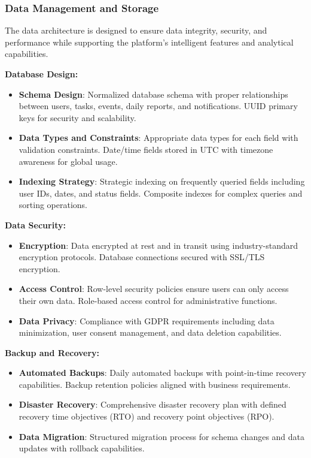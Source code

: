 \documentclass[12pt,a4paper]{article}
\begin{document}
\subsubsection{Data Management and Storage}

The data architecture is designed to ensure data integrity, security, and performance while supporting the platform's intelligent features and analytical capabilities.

\textbf{Database Design:}
\begin{itemize}
  \item \textbf{Schema Design}: Normalized database schema with proper relationships between users, tasks, events, daily reports, and notifications. UUID primary keys for security and scalability.
  \item \textbf{Data Types and Constraints}: Appropriate data types for each field with validation constraints. Date/time fields stored in UTC with timezone awareness for global usage.
  \item \textbf{Indexing Strategy}: Strategic indexing on frequently queried fields including user IDs, dates, and status fields. Composite indexes for complex queries and sorting operations.
\end{itemize}

\textbf{Data Security:}
\begin{itemize}
  \item \textbf{Encryption}: Data encrypted at rest and in transit using industry-standard encryption protocols. Database connections secured with SSL/TLS encryption.
  \item \textbf{Access Control}: Row-level security policies ensure users can only access their own data. Role-based access control for administrative functions.
  \item \textbf{Data Privacy}: Compliance with GDPR requirements including data minimization, user consent management, and data deletion capabilities.
\end{itemize}

\textbf{Backup and Recovery:}
\begin{itemize}
  \item \textbf{Automated Backups}: Daily automated backups with point-in-time recovery capabilities. Backup retention policies aligned with business requirements.
  \item \textbf{Disaster Recovery}: Comprehensive disaster recovery plan with defined recovery time objectives (RTO) and recovery point objectives (RPO).
  \item \textbf{Data Migration}: Structured migration process for schema changes and data updates with rollback capabilities.
\end{itemize}
\end{document}
